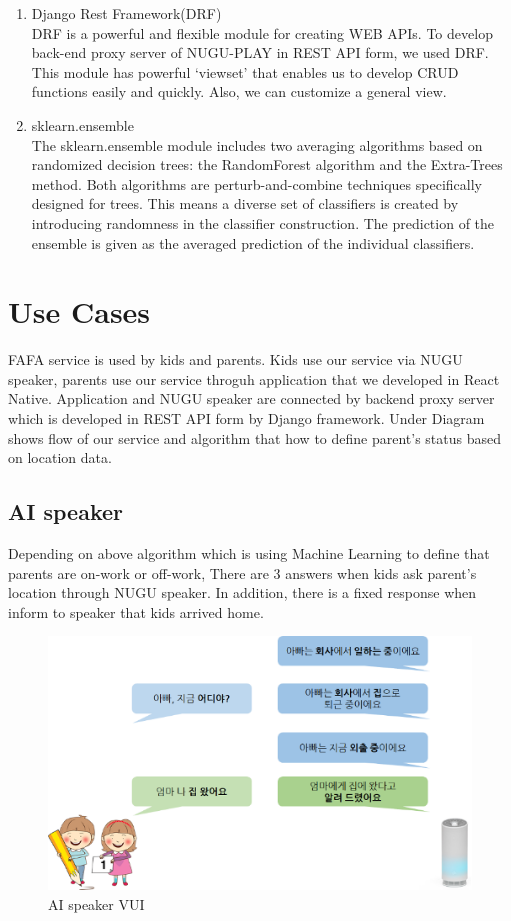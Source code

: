 \documentclass[conference]{IEEEtran}
\begin{document}
\begin{enumerate}
    \item Django Rest Framework(DRF)\\
    DRF is a powerful and flexible module for creating WEB APIs. To develop back-end proxy server of NUGU-PLAY in REST API form, we used DRF. This module has powerful ‘viewset’ that enables us to develop CRUD functions easily and quickly. Also, we can customize a general view. \\
    \item sklearn.ensemble\\
    The sklearn.ensemble module includes two averaging algorithms based on randomized decision trees: the RandomForest algorithm and the Extra-Trees method. Both algorithms are perturb-and-combine techniques specifically designed for trees. This means a diverse set of classifiers is created by introducing randomness in the classifier construction. The prediction of the ensemble is given as the averaged prediction of the individual classifiers.\\
\end{enumerate}

\section{Use Cases}
FAFA service is used by kids and parents. Kids use our service via NUGU speaker, parents use our service throguh application that we developed in React Native. Application and NUGU speaker are connected by backend proxy server which is developed in REST API form by Django framework. Under Diagram shows flow of our service and algorithm that how to define parent’s status based on location data.
\subsection{AI speaker}
Depending on above algorithm which is using Machine Learning to define that parents are on-work or off-work, There are 3 answers when kids ask parent’s location through NUGU speaker. In addition, there is a fixed response when inform to speaker that kids arrived home.\\
\begin{figure}[htbp]
    \centering
    \includegraphics{images/f7.png}
    \caption{AI speaker VUI}
\end{figure}
\end{document}
